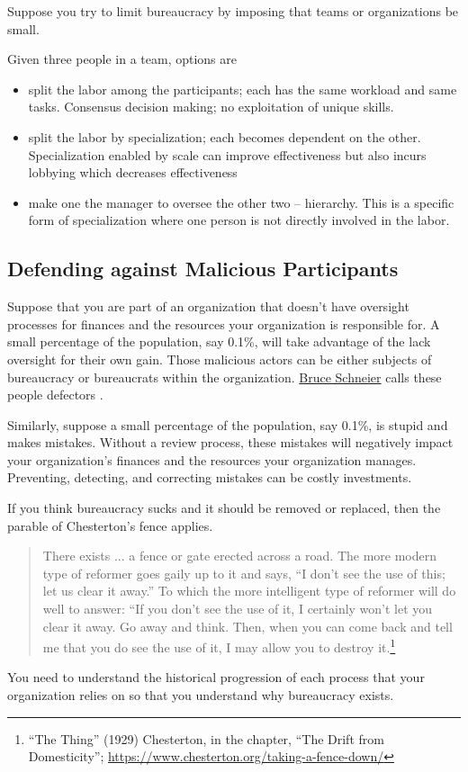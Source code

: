 Suppose you try to limit bureaucracy by imposing that teams or organizations be small.

Given three people in a team, options are
\begin{itemize}
    \item split the labor among the participants; each has the same workload and same tasks. Consensus decision making; no exploitation of unique skills.
    \item split the labor by specialization; each becomes dependent on the other. Specialization enabled by scale can improve effectiveness but also incurs lobbying which decreases effectiveness 
    \item make one the manager to oversee the other two -- hierarchy. This is a specific form of specialization where one person is not directly involved in the labor.
\end{itemize}


\subsection{Defending against Malicious Participants}

Suppose that you are part of an organization that doesn't have oversight processes for finances and the resources your organization is responsible for. A small percentage of the population, say 0.1\%, will take advantage of the lack oversight for their own gain. Those malicious actors can be either subjects of bureaucracy or bureaucrats within the organization. \href{https://en.wikipedia.org/wiki/Bruce_Schneier}{Bruce Schneier} calls these people defectors \cite{2012_Schneier}.

Similarly, suppose a small percentage of the population, say 0.1\%, is stupid and makes mistakes. Without a review process, these mistakes will negatively impact your organization's finances and the resources your organization manages. Preventing, detecting, and correcting mistakes can be costly investments. 

If you think bureaucracy sucks and it should be removed or replaced, then the parable of Chesterton's fence applies. 
\begin{quote}
There exists ... a fence or gate erected across a road. The more modern type of reformer goes gaily up to it and says, “I don’t see the use of this; let us clear it away.” To which the more intelligent type of reformer will do well to answer: “If you don’t see the use of it, I certainly won’t let you clear it away. Go away and think. Then, when you can come back and tell me that you do see the use of it, I may allow you to destroy it.\footnote{``The Thing'' (1929) Chesterton, in the chapter, ``The Drift from Domesticity''; \href{https://www.chesterton.org/taking-a-fence-down/}{https://www.chesterton.org/taking-a-fence-down/}}
\end{quote}
You need to understand the historical progression of each process that your organization relies on so that you understand why bureaucracy exists.

